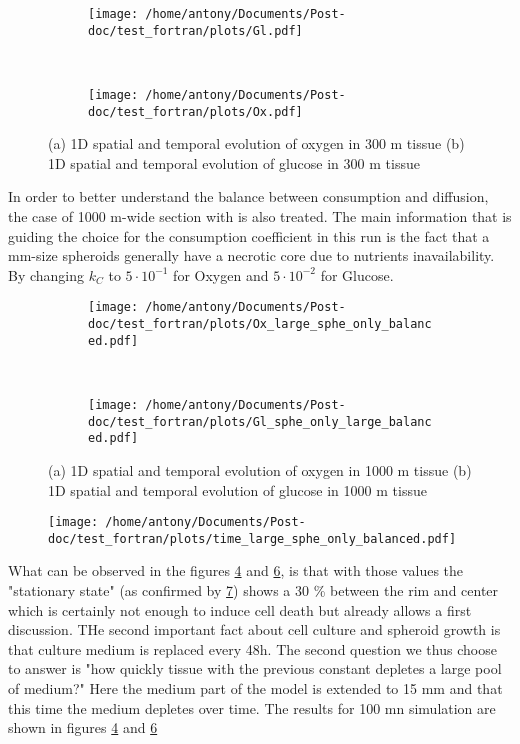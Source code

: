 \documentclass[11pt,a4paper]{article}
\begin{document}
\begin{figure}[ht!]
	\begin{subfigure}{0.5\textwidth}
	\centering
	\texttt{[image: /home/antony/Documents/Post-doc/test\_fortran/plots/Gl.pdf]}
	\caption{\label{Gl}}
	\end{subfigure}
	~~
	\begin{subfigure}{0.5\textwidth}
	\centering
	\texttt{[image: /home/antony/Documents/Post-doc/test\_fortran/plots/Ox.pdf]}
	\caption{\label{Ox}}
	\end{subfigure}
	\caption{(a) 1D spatial and temporal evolution of oxygen in 300 \textmu m tissue (b) 1D spatial and temporal evolution of glucose in 300 \textmu m tissue}
\end{figure}

In order to better understand the balance between consumption and diffusion, the case of 1000 \textmu m-wide section with is also treated. The main information that is guiding  the choice for the consumption coefficient in this run is the fact that a mm-size spheroids generally have a necrotic core due to nutrients inavailability. By changing $k_C$ to $5 \cdot 10^{-1}$ for Oxygen and $5 \cdot 10^{-2}$ for Glucose.

\begin{figure}[ht!]
	\begin{subfigure}{0.5\textwidth}
	\centering
	\texttt{[image: /home/antony/Documents/Post-doc/test\_fortran/plots/Ox\_large\_sphe\_only\_balanced.pdf]}
	\caption{ \label{Ox_bal}}
	\end{subfigure}
	~~
	\begin{subfigure}{0.5\textwidth}
	\texttt{[image: /home/antony/Documents/Post-doc/test\_fortran/plots/Gl\_sphe\_only\_large\_balanced.pdf]}
		\caption{ \label{Gl_bal}}
	\end{subfigure}
	\caption{(a) 1D spatial and temporal evolution of oxygen in 1000 \textmu m tissue (b) 1D spatial and temporal evolution of glucose in 1000 \textmu m tissue}
\end{figure}

\begin{figure}[ht!]
	\centering
	\texttt{[image: /home/antony/Documents/Post-doc/test\_fortran/plots/time\_large\_sphe\_only\_balanced.pdf]}
	\caption{\label{t_bal}}
\end{figure}

What can be observed in the figures \ref{Ox_bal} and \ref{Gl_bal}, is that with those values the "stationary state" (as confirmed by \ref{t_bal}) shows a 30 \% between the rim and center which is certainly not enough to induce cell death but already allows a first discussion. THe second important fact about cell culture and spheroid growth is that culture medium is replaced every 48h. The second question we thus choose to answer is "how quickly tissue with  the previous constant depletes a large pool of medium?" Here the medium part of the model is extended to 15 mm and that this time the medium depletes over time. The results for 100 mn simulation are shown in  figures \ref{Ox_bal} and \ref{Gl_bal}
\end{document}
